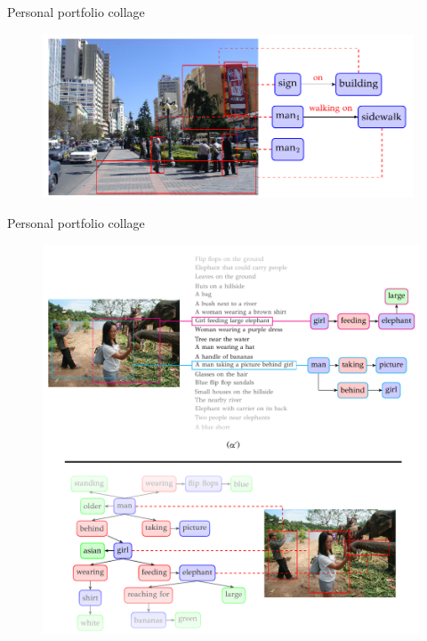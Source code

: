 \begin{frame}{Personal portfolio collage}
  \begin{figure}
    \includegraphics[width=0.98\textwidth]{./img/portfolio/scene_graph_generation.pdf}
  \end{figure}
\end{frame}

\begin{frame}{Personal portfolio collage}
  \begin{figure}
    \includegraphics[height=0.9\textheight]{./img/portfolio/visual_genome_1.pdf}
  \end{figure}
\end{frame}

